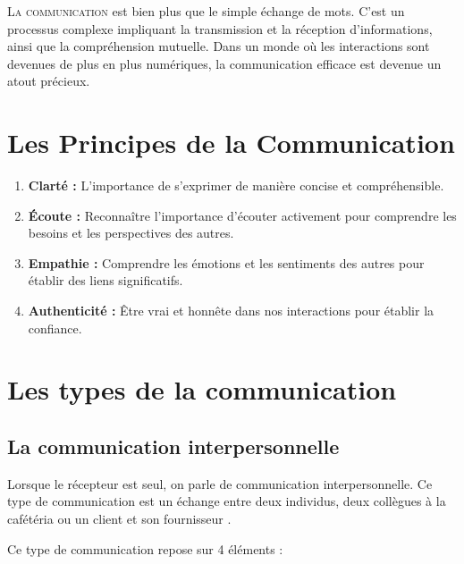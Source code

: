 \documentclass[a4paper, 11pt, oneside]{book}
\begin{document}
\lettrine[lines=2, depth=0, lraise=-0.1, findent=0.3em, nindent=0.3em]{\color{BrickRed}\fontsize{50pt}{72pt}L}{a communication} est bien plus que le simple échange de mots. C'est un processus complexe impliquant la transmission et la réception d'informations, ainsi que la compréhension mutuelle. Dans un monde où les interactions sont devenues de plus en plus numériques, la communication efficace est devenue un atout précieux.


\section{Les Principes de la Communication}\label{sec:prova}

\begin{enumerate}
    \item \textbf{Clarté :} L'importance de s'exprimer de manière concise et compréhensible.
    \item \textbf{Écoute :} Reconnaître l'importance d'écouter activement pour comprendre les besoins et les perspectives des autres.
    \item \textbf{Empathie :} Comprendre les émotions et les sentiments des autres pour établir des liens significatifs.
    \item \textbf{Authenticité :} Être vrai et honnête dans nos interactions pour établir la confiance.
\end{enumerate}

\section{Les types de la communication}\label{subsec:prova}
\subsection{La communication interpersonnelle}
Lorsque le récepteur est seul, on parle de communication interpersonnelle. Ce type de communication est un échange entre deux individus, deux collègues à la cafétéria ou un client et son fournisseur \cite{haiilo}.

Ce type de communication repose sur 4 éléments :
\end{document}
